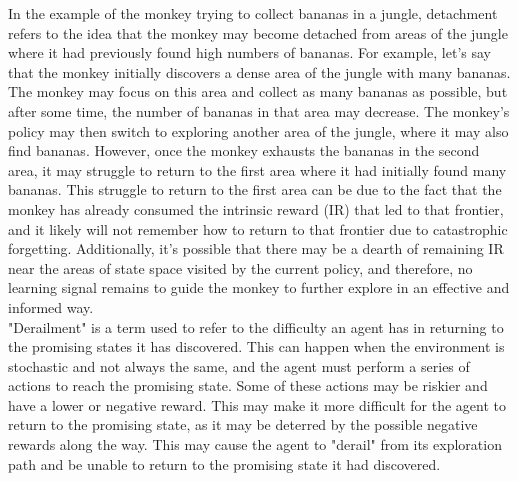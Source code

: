 \documentclass[runningheads]{llncs}%
\begin{document}
In the example of the monkey trying to collect bananas in a jungle, detachment refers to the idea that the monkey may become detached from areas of the jungle where it had previously found high numbers of bananas. For example, let's say that the monkey initially discovers a dense area of the jungle with many bananas. The monkey may focus on this area and collect as many bananas as possible, but after some time, the number of bananas in that area may decrease. The monkey's policy may then switch to exploring another area of the jungle, where it may also find bananas. However, once the monkey exhausts the bananas in the second area, it may struggle to return to the first area where it had initially found many bananas. This struggle to return to the first area can be due to the fact that the monkey has already consumed the intrinsic reward (IR) that led to that frontier, and it likely will not remember how to return to that frontier due to catastrophic forgetting. Additionally, it's possible that there may be a dearth of remaining IR near the areas of state space visited by the current policy, and therefore, no learning signal remains to guide the monkey to further explore in an effective and informed way.\\

"Derailment" is a term used to refer to the difficulty an agent has in returning to the promising states it has discovered. This can happen when the environment is stochastic and not always the same, and the agent must perform a series of actions to reach the promising state. Some of these actions may be riskier and have a lower or negative reward. This may make it more difficult for the agent to return to the promising state, as it may be deterred by the possible negative rewards along the way. This may cause the agent to "derail" from its exploration path and be unable to return to the promising state it had discovered.\\
\end{document}
